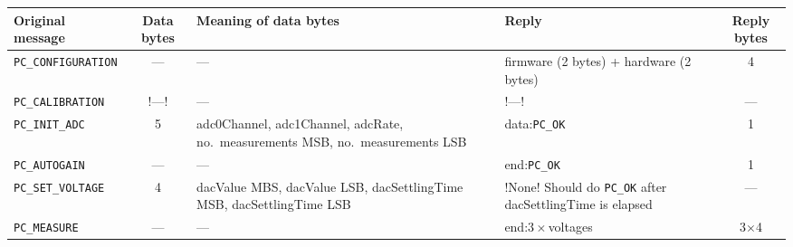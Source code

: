 \documentclass[11pt,a4paper,english]{article}
\begin{document}
\begin{center}
\begin{tabular}{lcp{}p{}c}\toprule
Original message            & Data bytes & Meaning of data bytes  & Reply & Reply bytes\\\midrule
\texttt{PC\_CONFIGURATION}  & ---        & ---								        & firmware (2 bytes) + hardware (2 bytes) & 4\\
\texttt{PC\_CALIBRATION}    & !---!      & ---                                        & !---!                     & ---\\
\texttt{PC\_INIT\_ADC}      & 5 & adc0Channel, adc1Channel, adcRate, no.\ measurements MSB, no.\ measurements LSB & data:\texttt{PC\_OK}  & 1\\
\texttt{PC\_AUTOGAIN}       & ---        & ---                                        & end:\texttt{PC\_OK}       & 1\\
\texttt{PC\_SET\_VOLTAGE}   & 4          & dacValue MBS, dacValue LSB, dacSettlingTime MSB, dacSettlingTime LSB & !None! Should do \texttt{PC\_OK} after dacSettlingTime is elapsed & ---\\
\texttt{PC\_MEASURE}        & ---        & ---                                        & end:$3\times$voltages     & 3$\times$4\\
\bottomrule
\end{tabular}
\end{center}
\end{document}
